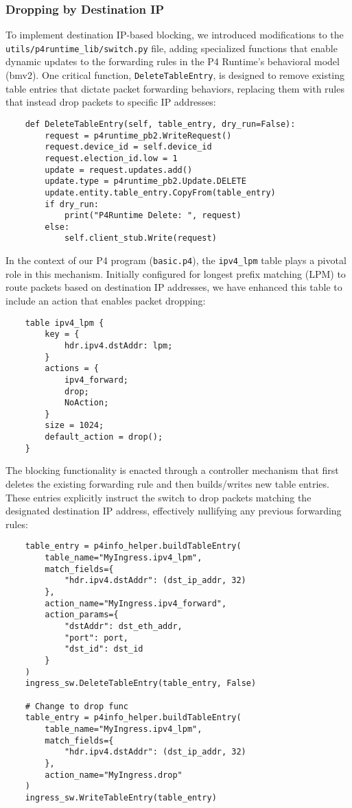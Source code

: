 \subsubsection{Dropping by Destination IP}
To implement destination IP-based blocking, we introduced modifications to the \verb|utils/p4runtime_lib/|\verb|switch.py| file, adding specialized functions that enable dynamic updates to the forwarding rules in the P4 Runtime's behavioral model (bmv2). One critical function, \verb|DeleteTableEntry|, is designed to remove existing table entries that dictate packet forwarding behaviors, replacing them with rules that instead drop packets to specific IP addresses:
\begin{lstlisting}
    def DeleteTableEntry(self, table_entry, dry_run=False):
        request = p4runtime_pb2.WriteRequest()
        request.device_id = self.device_id
        request.election_id.low = 1
        update = request.updates.add()
        update.type = p4runtime_pb2.Update.DELETE
        update.entity.table_entry.CopyFrom(table_entry)
        if dry_run:
            print("P4Runtime Delete: ", request)
        else:
            self.client_stub.Write(request)
\end{lstlisting}
In the context of our P4 program (\verb|basic.p4|), the \verb|ipv4_lpm| table plays a pivotal role in this mechanism. Initially configured for longest prefix matching (LPM) to route packets based on destination IP addresses, we have enhanced this table to include an action that enables packet dropping:
\begin{lstlisting}
    table ipv4_lpm {
        key = {
            hdr.ipv4.dstAddr: lpm;
        }
        actions = {
            ipv4_forward;
            drop;
            NoAction;
        }
        size = 1024;
        default_action = drop();
    }
\end{lstlisting}
The blocking functionality is enacted through a controller mechanism that first deletes the existing forwarding rule and then builds/writes new table entries. These entries explicitly instruct the switch to drop packets matching the designated destination IP address, effectively nullifying any previous forwarding rules:
\begin{lstlisting}
    table_entry = p4info_helper.buildTableEntry(
        table_name="MyIngress.ipv4_lpm",
        match_fields={
            "hdr.ipv4.dstAddr": (dst_ip_addr, 32)
        },
        action_name="MyIngress.ipv4_forward",
        action_params={
            "dstAddr": dst_eth_addr,
            "port": port,
            "dst_id": dst_id
        }
    )
    ingress_sw.DeleteTableEntry(table_entry, False)
    
    # Change to drop func
    table_entry = p4info_helper.buildTableEntry(
        table_name="MyIngress.ipv4_lpm",
        match_fields={
            "hdr.ipv4.dstAddr": (dst_ip_addr, 32)
        },
        action_name="MyIngress.drop"
    )
    ingress_sw.WriteTableEntry(table_entry)
\end{lstlisting}
